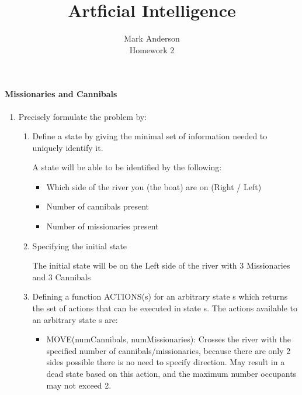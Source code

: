 \documentclass[12pt]{article}
\begin{document}
 
\title{Artficial Intelligence} 
\author{Mark Anderson\\ 
Homework 2} 
 
\maketitle
 
 
\paragraph{Missionaries and Cannibals}
\begin{enumerate}

  \item Precisely formulate the problem by:\par
  \begin{enumerate}
    \item Define a state by giving the minimal set of information needed to uniquely identify it.\par
      A state will be able to be identified by the following: \par
      \begin{itemize}
        \item Which side of the river you (the boat) are on (Right / Left)
        \item Number of cannibals present
        \item Number of missionaries present
      \end{itemize}
    \item Specifying the initial state\par
    The initial state will be on the Left side of the river with 3 Missionaries and 3 Cannibals

    \item Defining a function ACTIONS(s) for an arbitrary state s which returns the set of actions that can be executed in state s.
    The actions available to an arbitrary state s are:
      \begin{itemize}
        \item MOVE(numCannibals, numMissionaries): Crosses the river with the specified number of cannibals/missionaries, because there are only 2 sides possible there is no need to specify direction.  May result in a dead state based on this action, and the maximum number occupants may not exceed 2.
      \end{itemize}


\end{enumerate}
\end{enumerate}
\end{document}
